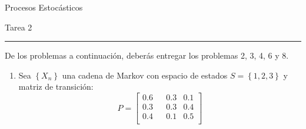 \documentclass{report}
\begin{document}
\begin{center}
    \textsf{\Large Procesos Estocásticos}
    \par\medskip
    \textsf{\large Tarea 2}
    \end{center}
    \hrule
    \par\bigskip

De los problemas a continuación, deberás entregar los problemas 2, 3, 4, 6 y 8.
\begin{enumerate}
    \item Sea $\left\{X_n\right\}$ una cadena de Markov con espacio de estados $S = \left\{1,2,3\right\}$ y matriz de transición:
    $$P= \left[
        \begin{matrix}
            0.6 & & 0.3 & 0.1 \\
            0.3 & & 0.3 & 0.4 \\
            0.4 & & 0.1 & 0.5 \\
        \end{matrix}
        \right]
    $$


\end{enumerate}
\end{document}
